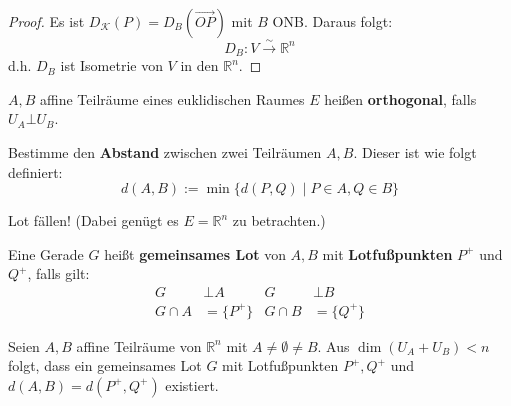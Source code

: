\documentclass[parskip,a4paper,twoside,DIV15,BCOR12mm]{scrbook}
\begin{document}
\begin{proof}
Es ist $D_\mathcal{K}(P)=D_B(\overrightarrow{OP})$ mit $B$ ONB. Daraus folgt:
\[D_B:V\stackrel{\sim}{\to}\mathbb{R}^n\] 
d.h. $D_B$ ist Isometrie von $V$ in den $\mathbb{R}^n$.
\end{proof}

\begin{comment}
Im Standardraum gilt:
\[\Autdist(\mathbb{R}^n)=\{(A,a)\in\Homaff(\mathbb{R}^n,\mathbb{R}^n)\mid A\in O_n\}\]
\end{comment}

\begin{definition}
$A,B$ affine Teilräume eines euklidischen Raumes $E$ heißen \textbf{orthogonal}, falls
$U_A \bot U_B$.
\end{definition}

\begin{task}
Bestimme den \textbf{Abstand} zwischen zwei Teilräumen $A,B$. Dieser ist wie folgt definiert:
\[d(A,B):=\min\{d(P,Q)\mid P\in A,Q\in B\}\]
\end{task}

\begin{method}
Lot fällen! (Dabei genügt es $E=\mathbb{R}^n$ zu betrachten.)
\end{method}

\begin{definition}
Eine Gerade $G$ heißt \textbf{gemeinsames Lot} von $A,B$ mit \textbf{Lotfußpunkten} $P^+$ 
und $Q^+$, falls gilt:
\begin{align*}
G&\bot A &G&\bot B\\
G\cap A&=\{P^+\} &G\cap B&=\{Q^+\} 
\end{align*}
\end{definition}

\begin{theo}
Seien $A,B$ affine Teilräume von $\mathbb{R}^n$ mit $A\ne\emptyset\ne B$. Aus $\dim(U_A+U_B)<n$ folgt, dass
ein gemeinsames Lot $G$ mit Lotfußpunkten $P^+,Q^+$ und $d(A,B)=d(P^+,Q^+)$ existiert.
\end{theo}
\end{document}
